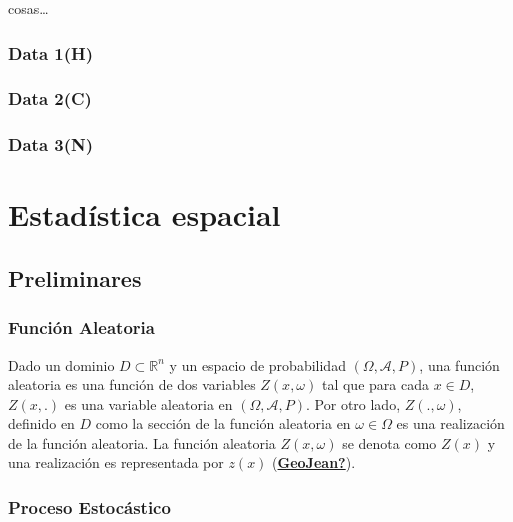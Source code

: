 \documentclass[
]{book}
\begin{document}
cosas\ldots{}

\hypertarget{data-1h}{%
\subsection{Data 1(H)}\label{data-1h}}

\hypertarget{data-2c}{%
\subsection{Data 2(C)}\label{data-2c}}

\hypertarget{data-3n}{%
\subsection{Data 3(N)}\label{data-3n}}

\hypertarget{estaduxedstica-espacial}{%
\chapter{Estadística espacial}\label{estaduxedstica-espacial}}

\hypertarget{preliminares}{%
\section{Preliminares}\label{preliminares}}

\hypertarget{funciuxf3n-aleatoria}{%
\subsection{Función Aleatoria}\label{funciuxf3n-aleatoria}}

Dado un dominio \(D\subset \mathbb{R}^n\) y un espacio de probabilidad \((\Omega,\mathcal{A},P)\), una función aleatoria es una función de dos variables \(Z(x,\omega)\) tal que para cada \(x\in D\), \(Z(x,.)\) es una variable aleatoria en \((\Omega,\mathcal{A},P)\). Por otro lado, \(Z(.,\omega)\), definido en \(D\) como la sección de la función aleatoria en \(\omega \in \Omega\) es una realización de la función aleatoria. La función aleatoria \(Z(x,\omega)\) se denota como \(Z(x)\) y una realización es representada por \(z(x)\) (\protect\hyperlink{ref-GeoJean}{\textbf{GeoJean?}}).

\hypertarget{proceso-estocuxe1stico}{%
\subsection{Proceso Estocástico}\label{proceso-estocuxe1stico}}
\end{document}
